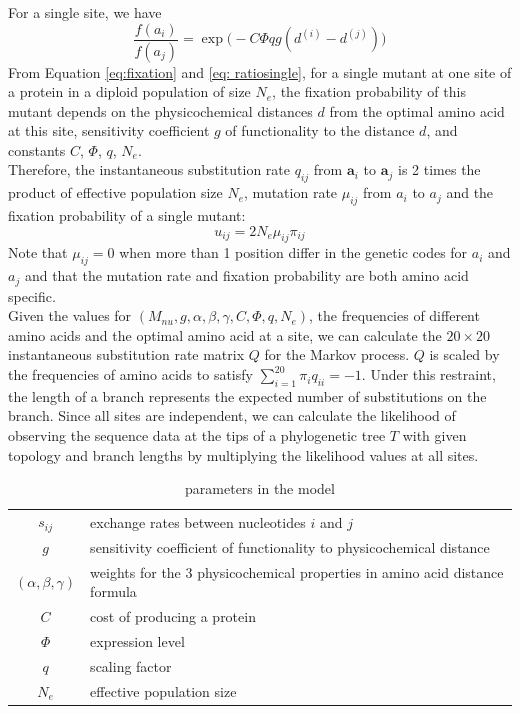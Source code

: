 \documentclass[13pt]{article}
\begin{document}
For a single site, we have 
\begin{equation}
\frac{f(a_i)}{f(a_j)} = \exp\Big(-C\Phi q g(d^{(i)}-d^{(j)})\Big)
\label{eq: ratiosingle}
\end{equation}
From Equation \ref{eq:fixation} and \ref{eq: ratiosingle}, for a single mutant at one site of a protein in a diploid population of size $N_e$, the fixation probability of this mutant depends on the physicochemical distances $d$ from the optimal amino acid at this site, sensitivity coefficient $g$ of functionality to the distance $d$, and constants $C$, $\Phi$, $q$, $N_e$.\\


Therefore, the instantaneous substitution rate $q_{ij}$ from $\mathbf{a}_i$ to $\mathbf{a}_j$ is 2 times the product of effective population size $N_e$, mutation rate $\mu_{ij}$ from $a_i$ to $a_j$ and the fixation probability of a single mutant:
\begin{equation}
u_{ij} = 2N_e \mu_{ij} \pi_{ij}
\label{eq:subrate}
\end{equation}
Note that $\mu_{ij} = 0$ when more than 1 position differ in the genetic codes for $a_i$ and $a_j$ and that the mutation rate and fixation probability are both amino acid specific. \\

Given the values for $(M_{nu},g, \alpha, \beta, \gamma, C, \Phi, q, N_e)$, the frequencies of different amino acids and the optimal amino acid at a site, we can calculate the $20 \times 20$ instantaneous substitution rate matrix $Q$ for the Markov process. $Q$ is scaled by the frequencies of amino acids to satisfy $\sum_{i=1}^{20} \pi_i q_{ii}= -1$. Under this restraint, the length of a branch represents the expected number of substitutions on the branch. Since all sites are independent, we can calculate the likelihood of observing the sequence data at the tips of a phylogenetic tree $T$ with given topology and branch lengths by multiplying the likelihood values at all sites.\\

\begin{table}[h]
\centering
\caption{parameters in the model}
\begin{tabular}{ c p{6cm} }
\hline
$s_{ij}$ & exchange rates between nucleotides $i$ and $j$ \\
$g$       & sensitivity coefficient of functionality to physicochemical distance \\
$(\alpha,\beta,\gamma)$ & weights for the 3 physicochemical properties in amino acid distance formula \\
$C$ & cost of producing a protein\\
$\Phi$ & expression level \\
$q$ & scaling factor \\
$N_e$ & effective population size \\
\hline
\end{tabular}

\label{tb: para}
\end{table}
\end{document}
